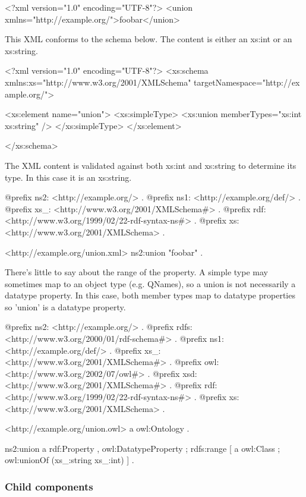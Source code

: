 \begin{DoxyCodeInclude}
<?xml version="1.0" encoding="UTF-8"?>
<union xmlns="http://example.org/">foobar</union>

\end{DoxyCodeInclude}


This XML conforms to the schema below. The content is either an xs:int or an xs:string.


\begin{DoxyCodeInclude}
<?xml version="1.0" encoding="UTF-8"?>
<xs:schema xmlns:xs="http://www.w3.org/2001/XMLSchema" targetNamespace="http://ex
      ample.org/">
        
        <xs:element name="union">
                <xs:simpleType>
                        <xs:union memberTypes="xs:int xs:string" />
                </xs:simpleType>
        </xs:element>
        
</xs:schema>
\end{DoxyCodeInclude}


The XML content is validated against both xs:int and xs:string to determine its type. In this case it is an xs:string.


\begin{DoxyCodeInclude}
@prefix ns2:     <http://example.org/> .
@prefix ns1:     <http://example.org/def/> .
@prefix xs_:     <http://www.w3.org/2001/XMLSchema#> .
@prefix rdf:     <http://www.w3.org/1999/02/22-rdf-syntax-ns#> .
@prefix xs:      <http://www.w3.org/2001/XMLSchema> .

<http://example.org/union.xml>
      ns2:union "foobar" .
\end{DoxyCodeInclude}


There's little to say about the range of the property. A simple type may sometimes map to an object type (e.g. QNames), so a union is not necessarily a datatype property. In this case, both member types map to datatype properties so 'union' is a datatype property.


\begin{DoxyCodeInclude}
@prefix ns2:     <http://example.org/> .
@prefix rdfs:    <http://www.w3.org/2000/01/rdf-schema#> .
@prefix ns1:     <http://example.org/def/> .
@prefix xs_:     <http://www.w3.org/2001/XMLSchema#> .
@prefix owl:     <http://www.w3.org/2002/07/owl#> .
@prefix xsd:     <http://www.w3.org/2001/XMLSchema#> .
@prefix rdf:     <http://www.w3.org/1999/02/22-rdf-syntax-ns#> .
@prefix xs:      <http://www.w3.org/2001/XMLSchema> .

<http://example.org/union.owl>
      a       owl:Ontology .

ns2:union
      a       rdf:Property , owl:DatatypeProperty ;
      rdfs:range
              [ a       owl:Class ;
                owl:unionOf (xs_:string xs_:int)
              ] .
\end{DoxyCodeInclude}
\hypertarget{union_unionChildren}{}\subsubsection{Child components}\label{union_unionChildren}

